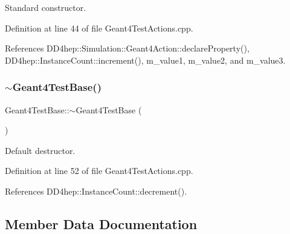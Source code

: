 Standard constructor. 



Definition at line 44 of file Geant4\+Test\+Actions.\+cpp.



References D\+D4hep\+::\+Simulation\+::\+Geant4\+Action\+::declare\+Property(), D\+D4hep\+::\+Instance\+Count\+::increment(), m\+\_\+value1, m\+\_\+value2, and m\+\_\+value3.

\hypertarget{class_d_d4hep_1_1_simulation_1_1_test_1_1_geant4_test_base_aa2aa8fa1fb375f02c3fa54116c90ef27}{}\label{class_d_d4hep_1_1_simulation_1_1_test_1_1_geant4_test_base_aa2aa8fa1fb375f02c3fa54116c90ef27} 
\subsubsection{\texorpdfstring{$\sim$\+Geant4\+Test\+Base()}{~Geant4TestBase()}}
{\footnotesize\ttfamily Geant4\+Test\+Base\+::$\sim$\+Geant4\+Test\+Base (\begin{DoxyParamCaption}{ }\end{DoxyParamCaption})\hspace{0.3cm}{\ttfamily [virtual]}}



Default destructor. 



Definition at line 52 of file Geant4\+Test\+Actions.\+cpp.



References D\+D4hep\+::\+Instance\+Count\+::decrement().



\subsection{Member Data Documentation}
\hypertarget{class_d_d4hep_1_1_simulation_1_1_test_1_1_geant4_test_base_aadfad14d5fb2fa03ca24c8ed07ec190d}{}\label{class_d_d4hep_1_1_simulation_1_1_test_1_1_geant4_test_base_aadfad14d5fb2fa03ca24c8ed07ec190d} 
